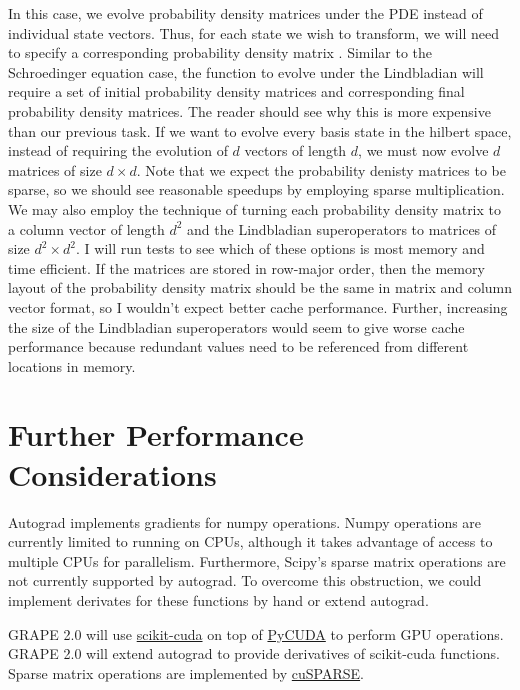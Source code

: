 \documentclass[letterpaper, 12pt]{article}
\begin{document}
In this case, we evolve probability density matrices under the PDE instead of individual state vectors. Thus, for each state we wish to transform, we will need to specify a corresponding probability density matrix \cite{basilewitsch2019reservoir}. Similar to the Schroedinger equation case, the function to evolve under the Lindbladian will require a set of initial probability density matrices and corresponding final probability density matrices. The reader should see why this is more expensive than our previous task. If we want to evolve every basis state in the hilbert space, instead of requiring the evolution of $d$ vectors of length $d$, we must now evolve $d$ matrices of size $d \times d$. Note that we expect the probability denisty matrices to be sparse, so we should see reasonable speedups by employing sparse multiplication. We may also employ the technique of turning each probability density matrix to a column vector of length $d^{2}$ and the Lindbladian superoperators to matrices of size $d^{2} \times d^{2}$. I will run tests to see which of these options is most memory and time efficient. If the matrices are stored in row-major order, then the memory layout of the probability density matrix should be the same in matrix and column vector format, so I wouldn't expect better cache performance. Further, increasing the size of the Lindbladian superoperators would seem to give worse cache performance because redundant values need to be referenced from different locations in memory.

\section{Further Performance Considerations}
Autograd implements gradients for numpy operations. Numpy operations are currently limited to running on CPUs, although it takes advantage of access to multiple CPUs for parallelism. Furthermore, Scipy's sparse matrix operations are not currently supported by autograd. To overcome this obstruction, we could implement derivates for these functions by hand or extend autograd.

GRAPE 2.0 will use \href{https://scikit-cuda.readthedocs.io/en/latest/}{scikit-cuda} on top of \href{https://documen.tician.de/pycuda/}{PyCUDA} to perform GPU operations. GRAPE 2.0 will extend autograd to provide derivatives of scikit-cuda functions. Sparse matrix operations are implemented by \href{https://pyculib.readthedocs.io/en/latest/cusparse.html}{cuSPARSE}.
\end{document}

